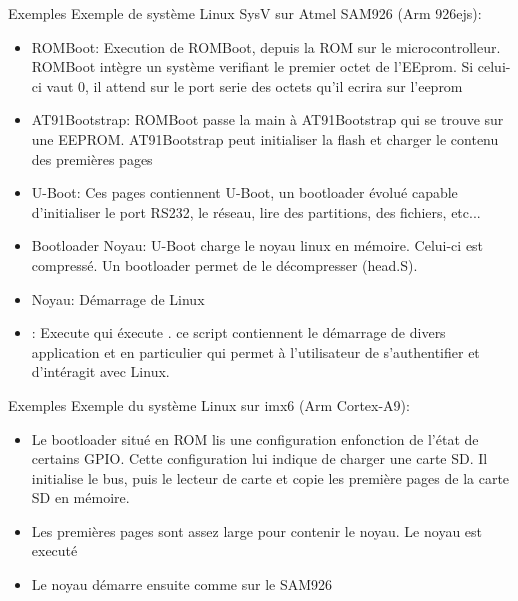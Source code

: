 \begin{frame}[fragile=singleslide]{Exemples}
  Exemple de système Linux SysV sur Atmel SAM926 (Arm 926ejs):
    \begin{itemize}
    \item  ROMBoot:  Execution  de  ROMBoot,  depuis  la  ROM  sur  le
      microcontrolleur.   ROMBoot  intègre  un  système  verifiant  le
      premier octet de l'EEprom. Si  celui-ci vaut 0, il attend sur le
      port serie des octets qu'il ecrira sur l'eeprom
    \item AT91Bootstrap: ROMBoot passe  la main à AT91Bootstrap qui se
      trouve sur  une EEPROM. AT91Bootstrap peut  initialiser la flash
      et charger le contenu des premières pages
    \item U-Boot:  Ces pages contiennent U-Boot,  un bootloader évolué
      capable  d'initialiser  le  port  RS232,  le  réseau,  lire  des
      partitions, des fichiers, etc...
    \item  Bootloader   Noyau:  U-Boot   charge  le  noyau   linux  en
      mémoire.  Celui-ci est  compressé.  Un  bootloader permet  de le
      décompresser (head.S).
    \item    Noyau:     Démarrage    de    Linux
    \item   {}:   Execute     qui
      éxecute .  ce script contiennent le démarrage
      de divers application et  en particulier  qui permet
      à l'utilisateur de s'authentifier et d'intéragit avec Linux.
    \end{itemize}
\end{frame}

\begin{frame}[fragile=singleslide]{Exemples}
  Exemple du système Linux sur imx6 (Arm Cortex-A9):
  \begin{itemize}
  \item Le bootloader situé en ROM lis une configuration enfonction de
    l'état  de  certains GPIO.   Cette  configuration  lui indique  de
    charger une  carte SD.  Il initialise  le bus, puis  le lecteur de
    carte et copie les première pages de la carte SD en mémoire.
  \item  Les  premières  pages  sont  assez  large  pour  contenir  le
    noyau. Le noyau est executé
  \item Le noyau démarre ensuite comme sur le SAM926
  \end{itemize}
\end{frame}

